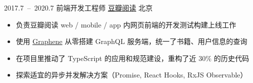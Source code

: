 \documentclass[12pt,a4paper,roman]{moderncv}   %
\begin{document}
\vspace{5pt}

\cventry
{2017.7\ –\ 2020.7}
{前端开发工程师}
{\href{https://read.douban.com}{\underline{豆瓣阅读}}}
{北京}
{}
{
  \begin{itemize}
  \item 负责豆瓣阅读 web / mobile / app 内网页前端的开发测试构建上线工作
  \item 使用 \href{https://graphene-python.org/}{Graphene} 从零搭建 GraphQL 服务端，统一了书籍、用户信息的查询
  \item 在项目里推动了 TypeScript 的应用和规范建设，重构了近 30\% 的历史代码
  \item 探索适宜的异步并发解决方案（Promise, React Hooks, RxJS Observable）
  \end{itemize}
}

\vspace{5pt}


\end{document}
